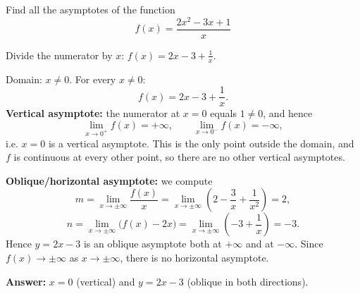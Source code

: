 
\begin{question}
Find all the asymptotes of the function
\[ f(x)=\frac{2x^2-3x+1}{x} \]
\end{question}

\begin{hint}
Divide the numerator by $x$: $f(x)=2x-3+\frac1x$.
\end{hint}

\begin{solution}
Domain: $x\neq0$. For every $x\neq 0$:
\[ f(x)=2x-3+\frac{1}{x}. \]
\textbf{Vertical asymptote:} the numerator at $x=0$ equals $1\neq0$, and hence
\[ \lim_{x\to0^+}f(x)=+\infty,\qquad \lim_{x\to0^-}f(x)=-\infty, \]
i.e. $x=0$ is a vertical asymptote. This is the only point outside the domain, and $f$ is continuous at every other point, so there are no other vertical asymptotes.

\textbf{Oblique/horizontal asymptote:} we compute
\[ m=\lim_{x\to\pm\infty}\frac{f(x)}{x}=\lim_{x\to\pm\infty}\left(2-\frac3x+\frac1{x^2}\right)=2, \]
\[ n=\lim_{x\to\pm\infty}\big(f(x)-2x\big)=\lim_{x\to\pm\infty}\left(-3+\frac1x\right)=-3. \]
Hence $y=2x-3$ is an oblique asymptote both at $+\infty$ and at $-\infty$. Since $f(x)\to\pm\infty$ as $x\to\pm\infty$, there is no horizontal asymptote.

\textbf{Answer:} $x=0$ (vertical) and $y=2x-3$ (oblique in both directions).
\end{solution}
